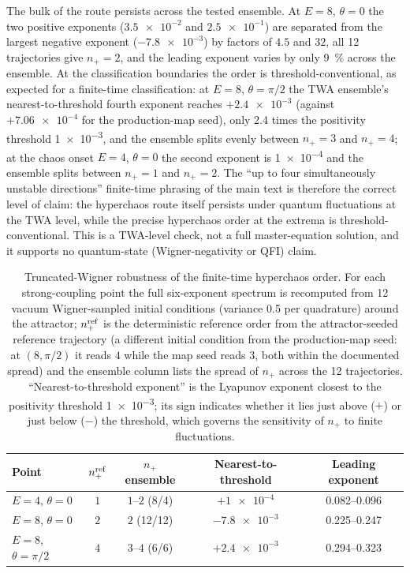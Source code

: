 \documentclass[preprint,numbers,a4paper]{elsarticle}
\begin{document}
The bulk of the route persists across the tested ensemble. At $E=\num{8}$, $\theta=0$ the two positive exponents ($\num{3.5e-2}$ and $\num{2.5e-1}$) are separated from the largest negative exponent ($\num{-7.8e-3}$) by factors of $\num{4.5}$ and $\num{32}$, all \num{12} trajectories give $n_+=2$, and the leading exponent varies by only \qty{9}{\percent} across the ensemble. At the classification boundaries the order is threshold-conventional, as expected for a finite-time classification: at $E=\num{8}$, $\theta=\pi/2$ the TWA ensemble's nearest-to-threshold fourth exponent reaches $+\num{2.4e-3}$ (against $+\num{7.06e-4}$ for the production-map seed), only \num{2.4} times the positivity threshold \num{1e-3}, and the ensemble splits evenly between $n_+=3$ and $n_+=4$; at the chaos onset $E=\num{4}$, $\theta=0$ the second exponent is \num{1e-4} and the ensemble splits between $n_+=1$ and $n_+=2$. The ``up to four simultaneously unstable directions'' finite-time phrasing of the main text is therefore the correct level of claim: the hyperchaos route itself persists under quantum fluctuations at the TWA level, while the precise hyperchaos order at the extrema is threshold-conventional. This is a TWA-level check, not a full master-equation solution, and it supports no quantum-state (Wigner-negativity or QFI) claim.

\begin{table}[h]
  \centering
  \caption{Truncated-Wigner robustness of the finite-time hyperchaos order. For each strong-coupling point the full six-exponent spectrum is recomputed from \num{12} vacuum Wigner-sampled initial conditions (variance \num{0.5} per quadrature) around the attractor; $n_+^{\rm ref}$ is the deterministic reference order from the attractor-seeded reference trajectory (a different initial condition from the production-map seed: at $(8,\pi/2)$ it reads $4$ while the map seed reads $3$, both within the documented spread) and the ensemble column lists the spread of $n_+$ across the \num{12} trajectories. ``Nearest-to-threshold exponent'' is the Lyapunov exponent closest to the positivity threshold \num{1e-3}; its sign indicates whether it lies just above ($+$) or just below ($-$) the threshold, which governs the sensitivity of $n_+$ to finite fluctuations.}
  \label{SI-tab:si-twa}
  \small
  \setlength{\tabcolsep}{4pt}
  \begin{tabular}{@{}lcccc@{}}
    \toprule
    Point & $n_+^{\rm ref}$ & $n_+$ ensemble & Nearest-to-threshold & Leading exponent \\
    \midrule
    $E=\num{4}$, $\theta=0$ & $1$ & $1$--$2$ (8/4) & $+\num{1e-4}$ & \num{0.082}--\num{0.096} \\
    $E=\num{8}$, $\theta=0$ & $2$ & $2$ (12/12) & $-\num{7.8e-3}$ & \num{0.225}--\num{0.247} \\
    $E=\num{8}$, $\theta=\pi/2$ & $4$ & $3$--$4$ (6/6) & $+\num{2.4e-3}$ & \num{0.294}--\num{0.323} \\
    \bottomrule
  \end{tabular}
\end{table}
\end{document}
